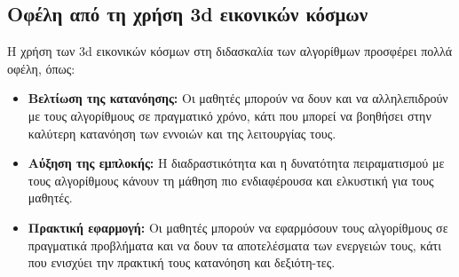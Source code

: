 
\subsection{Οφέλη από τη χρήση \acrshort{3d} εικονικών κόσμων}

Η χρήση των \acrshort{3d} εικονικών κόσμων στη διδασκαλία των αλγορίθμων προσφέρει πολλά οφέλη, όπως:

\begin{itemize}
    \item \textbf{Βελτίωση της κατανόησης:} Οι μαθητές μπορούν να δουν και να αλληλεπιδρούν με τους αλγορίθμους σε πραγματικό χρόνο, κάτι που μπορεί να βοηθήσει στην καλύτερη κατανόηση των εννοιών και της λειτουργίας τους\cite{crepinsek_note_2012}.
    \item \textbf{Αύξηση της εμπλοκής:} Η διαδραστικότητα και η δυνατότητα πειραματισμού με τους αλγορίθμους κάνουν τη μάθηση πιο ενδιαφέρουσα και ελκυστική για τους μαθητές\cite{bodner_role_1987}.
    \item \textbf{Πρακτική εφαρμογή:} Οι μαθητές μπορούν να εφαρμόσουν τους αλγορίθμους σε πραγματικά προβλήματα και να δουν τα αποτελέσματα των ενεργειών τους, κάτι που ενισχύει την πρακτική τους κατανόηση και δεξιότη-τες\cite{__2017}.
\end{itemize}
